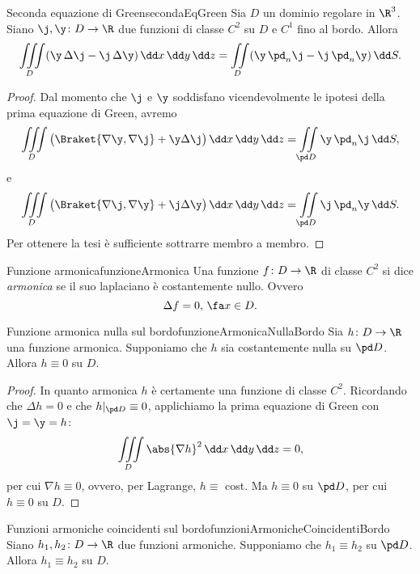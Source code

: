 \begin{prop}{Seconda equazione di Green}{secondaEqGreen}
	Sia \(D\) un dominio regolare in \(\R^3\).
	Siano \(\j,\y\colon D \to \R\) due funzioni di classe \(C^2\) su \(D\) e \(C^1\) fino al bordo.
	Allora
	\[
		\iiint\limits_D (\y\,\Delta \j - \j\,\Delta \y)\,\dd x\,\dd y\,\dd z = \iint\limits_D (\y\,\pd_n \j - \j\,\pd_n \y)\,\dd S.
	\]
\end{prop}

\begin{proof}
	Dal momento che \(\j\) e \(\y\) soddisfano vicendevolmente le ipotesi della prima equazione di Green, avremo
	\[
		\iiint\limits_D \big(\Braket{\nabla \y,\nabla \j} + \y\Delta \j\big)\,\dd x\,\dd y\,\dd z = \iint\limits_{\pd D} \y\,\pd_n \j\,\dd S,
	\]
	e
	\[
		\iiint\limits_D \big(\Braket{\nabla \j,\nabla \y} + \j\Delta \y\big)\,\dd x\,\dd y\,\dd z = \iint\limits_{\pd D} \j\,\pd_n \y\,\dd S.
	\]
	Per ottenere la tesi è sufficiente sottrarre membro a membro.
\end{proof}

\begin{defn}{Funzione armonica}{funzioneArmonica}
	Una funzione \(f\colon D \to \R\) di classe \(C^2\) si dice \emph{armonica} se il suo laplaciano è costantemente nullo.
	Ovvero
	\[
		\Delta f = 0,\,\fa x \in D.
	\]
\end{defn}

\begin{teor}{Funzione armonica nulla sul bordo}{funzioneArmonicaNullaBordo}
	Sia \(h\colon D \to \R\) una funzione armonica. Supponiamo che \(h\) sia costantemente nulla su \(\pd D\).
	Allora \(h\equiv 0\) su \(D\).
\end{teor}

\begin{proof}
	In quanto armonica \(h\) è certamente una funzione di classe \(C^2\).
	Ricordando che \(\Delta h = 0\) e che \(h|_{\pd D} \equiv 0\), applichiamo la prima equazione di Green con \(\j = \y = h\):
	\[
		\iiint\limits_D \abs{\nabla h}^2\,\dd x\,\dd y\,\dd z = 0,
	\]
	per cui \(\nabla h \equiv 0\), ovvero, per Lagrange, \(h\equiv\) cost.
	Ma \(h\equiv 0\) su \(\pd D\), per cui \(h \equiv 0\) su \(D\).
\end{proof}

\begin{teor}{Funzioni armoniche coincidenti sul bordo}{funzioniArmonicheCoincidentiBordo}
	Siano \(h_1,h_2\colon D \to \R\) due funzioni armoniche.
	Supponiamo che \(h_1 \equiv h_2\) su \(\pd D\).
	Allora \(h_1 \equiv h_2\) su \(D\).
\end{teor}

